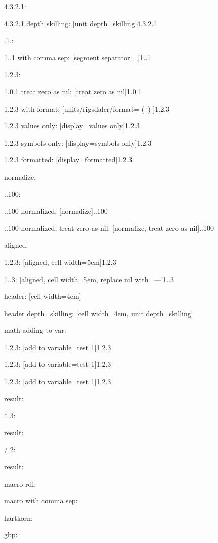 \documentclass{article}
\begin{document}
4.3.2.1: \hfill {}

4.3.2.1 depth skilling: \hfill {}[unit depth=skilling]{4.3.2.1}

.1.: \hfill {}

1..1 with comma sep: \hfill {}[segment separator={,}]{1..1}

1.2.3: \hfill {}

1.0.1 treat zero as nil: \hfill {}[treat zero as nil]{1.0.1}

1.2.3 with format: \hfill {}[units/rigsdaler/format={ (\SYMBOL\ \VALUE) }]{1.2.3}

1.2.3 values only: \hfill {}[display=values only]{1.2.3}

1.2.3 symbols only: \hfill {}[display=symbols only]{1.2.3}

1.2.3 formatted: \hfill {}[display=formatted]{1.2.3}

normalize:

..100: \hfill {}

..100 normalized: \hfill {}[normalize]{..100}

..100 normalized, treat zero as nil: \hfill {}[normalize, treat zero as nil]{..100}

aligned:

1.2.3: \hfill {}[aligned, cell width=5em]{1.2.3}

1..3: \hfill {}[aligned, cell width=5em, replace nil with={---}]{1..3}

header: \hfill {}[cell width=4em]

header depth=skilling: \hfill {}[cell width=4em, unit depth=skilling]

math adding to var:

1.2.3: \hfill {}[add to variable=test 1]{1.2.3}

1.2.3: \hfill {}[add to variable=test 1]{1.2.3}

1.2.3: \hfill {}[add to variable=test 1]{1.2.3}

result: \hfill {}

* 3: \hfill {}

result: \hfill {}

/ 2: \hfill {}

result: \hfill {}

macro rdl: \hfill {}

macro with comma sep: \hfill {}

hartkorn: \hfill {}

gbp: \hfill {}
\end{document}
